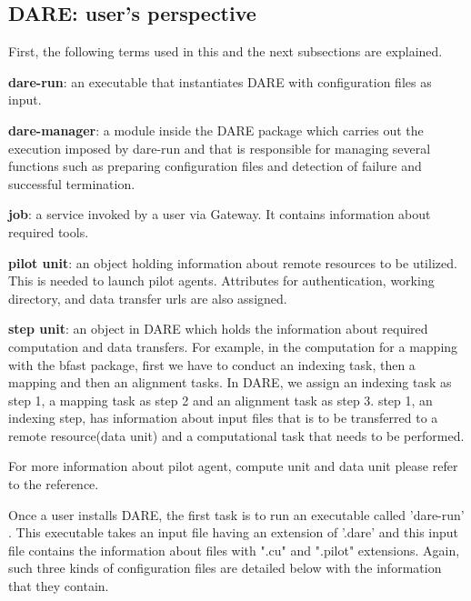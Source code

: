 \documentclass[]{svjour3}
\begin{document}
\subsection{DARE: user's perspective}

First, the following terms used in this and the next subsections are explained.

\textbf{dare-run}: an executable that instantiates DARE with configuration files as input.
 
\textbf{dare-manager}: a module inside the DARE package which carries out the execution imposed by dare-run and that is responsible for managing several functions such as preparing configuration files and detection of failure and successful termination.  

\textbf{job}: a service invoked by a user via Gateway. It contains information about required tools. 

\textbf{pilot unit}: an object holding information about remote resources to be utilized. This is needed to launch pilot agents.  Attributes for authentication, working directory, and data transfer urls are also assigned. 

\textbf{step unit}: an object in DARE which holds the information about required computation and data transfers. For example, in the computation for a mapping with the bfast package, first we have to conduct an indexing task, then a mapping and then an alignment tasks.  In DARE, we assign an indexing task as step 1, a mapping task as step 2 and an alignment task as step 3. step 1, an indexing step, has information about input files that is to be transferred to a remote resource(data unit) and a computational task that needs to be performed.

For more information about pilot agent, compute unit and data unit please refer to the reference\cite{pstar11}.

   
Once a user installs DARE, the first task is to run an executable called 'dare-run' . 
This executable takes an input file having an extension of '.dare' and this input file contains the information about files with ".cu" and ".pilot" extensions.  Again, such three kinds of configuration files are detailed below with the information that they contain.
\end{document}
